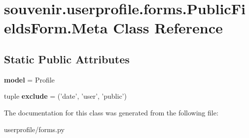 \hypertarget{classsouvenir_1_1userprofile_1_1forms_1_1PublicFieldsForm_1_1Meta}{\section{souvenir.\-userprofile.\-forms.\-Public\-Fields\-Form.\-Meta Class Reference}
\label{classsouvenir_1_1userprofile_1_1forms_1_1PublicFieldsForm_1_1Meta}
}
\subsection*{Static Public Attributes}
\begin{DoxyCompactItemize}
\item 
\hypertarget{classsouvenir_1_1userprofile_1_1forms_1_1PublicFieldsForm_1_1Meta_a29bca2d266db381d1f88125cd79cf14d}{{\bfseries model} = Profile}\label{classsouvenir_1_1userprofile_1_1forms_1_1PublicFieldsForm_1_1Meta_a29bca2d266db381d1f88125cd79cf14d}

\item 
\hypertarget{classsouvenir_1_1userprofile_1_1forms_1_1PublicFieldsForm_1_1Meta_abb5d25e42c9a7a07fe71d9d23fb55e9e}{tuple {\bfseries exclude} = ('date', 'user', 'public')}\label{classsouvenir_1_1userprofile_1_1forms_1_1PublicFieldsForm_1_1Meta_abb5d25e42c9a7a07fe71d9d23fb55e9e}

\end{DoxyCompactItemize}


The documentation for this class was generated from the following file\-:\begin{DoxyCompactItemize}
\item 
userprofile/forms.\-py\end{DoxyCompactItemize}
